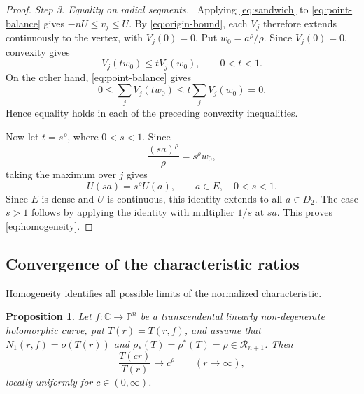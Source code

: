 \documentclass[11pt,letterpaper,reqno]{amsart}
\newtheorem{prop}[thm]{Proposition}
\theoremstyle{remark}
\numberwithin{equation}{section}
\newcommand{\C}{\mathbb C}
\newcommand{\PP}{\mathbb P}
\newcommand{\Gn}{\mathcal R_{n+1}}
\newcommand{\step}[1]{\medskip\noindent\emph{#1}\ }
\begin{document}
\begin{proof}
\step{Step 3. Equality on radial segments.}
Applying \eqref{eq:sandwich} to \eqref{eq:point-balance} gives
$-nU\leq v_j\leq U$. By \eqref{eq:origin-bound}, each $V_j$
therefore extends continuously to the vertex, with $V_j(0)=0$.
Put $w_0=a^\rho/\rho$. Since $V_j(0)=0$, convexity gives
\[
 V_j(tw_0)\leq tV_j(w_0),\qquad 0<t<1.
\]
On the other hand, \eqref{eq:point-balance} gives
\[
 0\leq\sum_jV_j(tw_0)
 \leq t\sum_jV_j(w_0)=0.
\]
Hence equality holds in each of the preceding convexity inequalities.

Now let $t=s^\rho$, where $0<s<1$. Since
\[
 \frac{(sa)^\rho}{\rho}=s^\rho w_0,
\]
taking the maximum over $j$ gives
\[
 U(sa)=s^\rho U(a),\qquad a\in E,\quad 0<s<1.
\]
Since $E$ is dense and $U$ is continuous, this identity extends to
all $a\in D_2$. The case $s>1$ follows by applying the identity with
multiplier $1/s$ at $sa$. This proves \eqref{eq:homogeneity}.
\end{proof}

\subsection{Convergence of the characteristic ratios}

Homogeneity identifies all possible limits of the normalized characteristic.

\begin{prop}\label{prop:regular-variation}
Let $f\colon\C\to\PP^n$ be a transcendental linearly non-degenerate
holomorphic curve, put $T(r)=T(r,f)$, and assume that $N_1(r,f)=o(T(r))$
and $\rho_*(T)=\rho^*(T)=\rho\in\Gn$. Then
\begin{equation}\label{eq:ratio-limit}
 \frac{T(cr)}{T(r)}\longrightarrow c^\rho\qquad(r\to\infty),
\end{equation}
locally uniformly for $c\in(0,\infty)$.
\end{prop}
\end{document}
